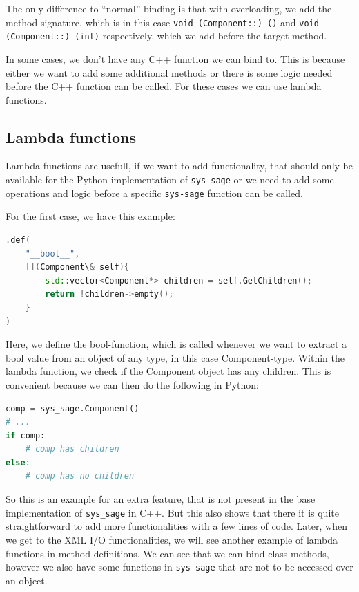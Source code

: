 The only difference to “normal” binding is that with overloading, we add the method signature, which is in this case \verb|void (Component::) ()| and \verb|void (Component::) (int)| respectively, which we add before the target method. \cite{pybind11-docu}

\smallskip
In some cases, we don't have any C++ function we can bind to. This is because either we want to add some additional methods or there is some logic needed before the C++ function can be called. For these cases we can use lambda functions.

\subsection{Lambda functions}

Lambda functions are usefull, if we want to add functionality, that should only be available for the Python implementation of \texttt{sys-sage} or we need to add some operations and logic before a specific \texttt{sys-sage} function can be called.

For the first case, we have this example:
\newpage
\begin{lstlisting}[language=C++, xleftmargin=4em, frame = single]
.def(
    "__bool__",
    [](Component\& self){
        std::vector<Component*> children = self.GetChildren();
        return !children->empty();
    }
)
\end{lstlisting}

Here, we define the bool-function, which is called whenever we want to extract a bool value from an object of any type, in this case Component-type. Within the lambda function, we check if the Component object has any children. This is convenient because we can then do the following in Python:

\begin{lstlisting}[language=Python,xleftmargin=4em, frame = single]
comp = sys_sage.Component()
# ...
if comp:
    # comp has children
else:
    # comp has no children
\end{lstlisting}

So this is an example for an extra feature, that is not present in the base implementation of \verb|sys_sage| in C++. But this also shows that there it is quite straightforward to add more functionalities with a few lines of code. Later, when we get to the XML I/O functionalities, we will see another example of lambda functions in method definitions.
\smallskip
We can see that we can bind class-methods, however we also have some functions in \texttt{sys-sage} that are not to be accessed over an object.


